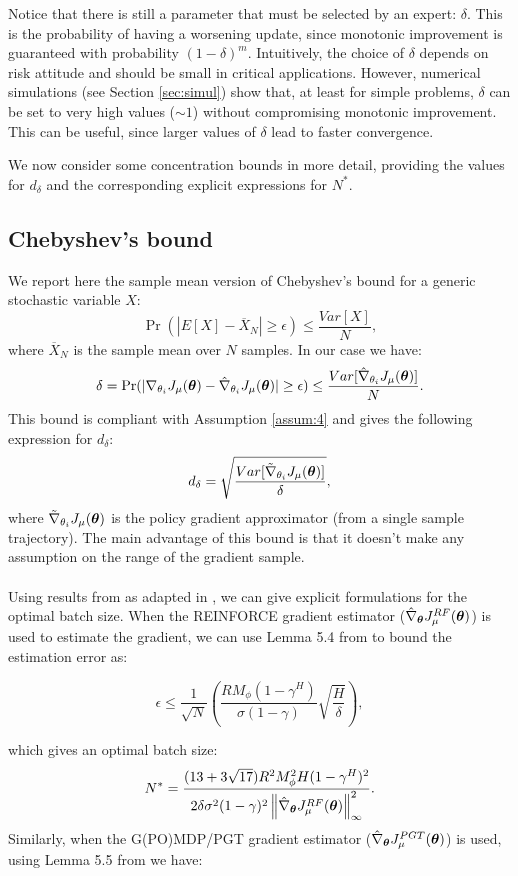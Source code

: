 Notice that there is still a parameter that must be selected by an expert: $\delta$. This is the probability of having a worsening update, since monotonic improvement is guaranteed with probability $(1-\delta)^m$. Intuitively, the choice of $\delta$ depends on risk attitude and should be small in critical applications. However, numerical simulations (see Section \ref{sec:simul}) show that, at least for simple problems, $\delta$ can be set to very high values ($\sim 1$) without compromising monotonic improvement. This can be useful, since larger values of $\delta$ lead to faster convergence.

We now consider some concentration bounds in more detail, providing the values for $d_{\delta}$ and the corresponding explicit expressions for $N^*$.

\subsection{Chebyshev's bound}\label{sec:chebyshev}
We report here the sample mean version of Chebyshev's bound for a generic stochastic variable $X$:
\[
	\Pr(|E[X] - \overline{X}_N| \geq \epsilon) \leq \frac{Var[X]}{N},
\]
where $\overline{X}_N$ is the sample mean over $N$ samples.
In our case we have:
\[
	\delta = \Pr(|\gradJ{\theta_i} - \gradApp{\theta_i}| 
		\geq \epsilon) \leq \frac{Var[\gradApp{\theta_i}]}{N}.
\]
This bound is compliant with Assumption \ref{assum:4} and gives the following expression for $d_\delta$:
\[
d_\delta = \sqrt{\frac{Var[\gradSim{\theta_i}]}{\delta}},
\]
where $\gradSim{\theta_i}$ is the policy gradient approximator (from a single sample trajectory).
The main advantage of this bound is that it doesn't make any assumption on the range of the gradient sample.
\paragraph{}
Using results from \cite{DBLP:journals/nn/ZhaoHNS12} as adapted in \cite{NIPS2013_5186}, we can give explicit formulations for the optimal batch size.
When the REINFORCE \cite{Williams1992} gradient estimator ($\gradRF{\vtheta}$) is used to estimate the gradient, we can use Lemma 5.4 from \cite{NIPS2013_5186} to bound the estimation error as:

\[
\epsilon \leq \frac{1}{\sqrt{N}}\left(\frac{RM_{\phi}(1-\gamma^H)}
				{\sigma(1-\gamma)}\sqrt{\frac{H}{\delta}}\right),
\]

which gives an optimal batch size:
\[
N^* = \frac{(13+3\sqrt{17})R^2M_{\phi}^2H(1-\gamma^H)^2}
	 		{2\delta\sigma^2(1-\gamma)^2
	 			\norm[\infty]{\gradRF{\vtheta}}^2}.
\]
Similarly, when the G(PO)MDP/PGT gradient estimator ($\gradPGT{\vtheta}$) is used, using Lemma 5.5 from \cite{NIPS2013_5186} we have:

